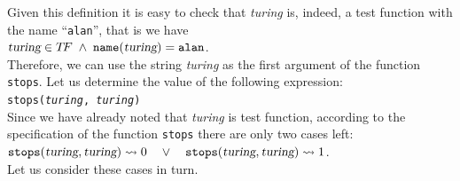 Given this definition it is easy to check that \textsl{turing} is, indeed, a test function with the name
``\texttt{alan}'', that is we have 
\\[0.3cm]
\hspace*{1.3cm} 
$\textsl{turing} \in T\!F \;\wedge\; \mathtt{name}(\textsl{turing}) = \mathtt{alan}$. 
\\[0.2cm]
Therefore, we can use the string \textsl{turing} as the first argument of the function
\texttt{stops}.
Let us determine the value of the following expression:
\\[0.2cm]
\hspace*{1.3cm} 
\texttt{stops(\textsl{turing}, \textsl{turing})} 
\\[0.2cm]
Since we have already noted that \textsl{turing} is test function, according to the specification of
the function \texttt{stops} there are only two cases left:
\\[0.2cm]
\hspace*{1.3cm} 
$\mathtt{stops}(\textsl{turing}, \textsl{turing}) \leadsto 0 \quad \vee\quad
 \mathtt{stops}(\textsl{turing}, \textsl{turing}) \leadsto 1$.
\\[0.2cm]
Let us consider these cases in turn.

